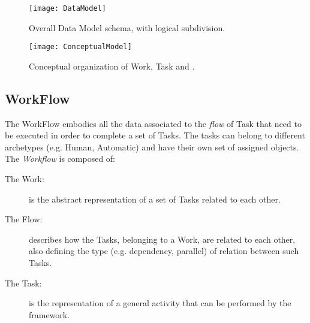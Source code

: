 \begin{figure}[htb]
    \centering
    \texttt{[image: DataModel]}
    \caption{Overall Data Model schema, with logical subdivision.}
    \label{fig:data-model}
\end{figure}
\begin{figure}[htb]
    \centering
    \texttt{[image: ConceptualModel]}
    \caption{Conceptual organization of Work, Task and \utask{}.}
    \label{fig:conceptual-model}
\end{figure}






\subsection{WorkFlow}
The WorkFlow embodies all the data associated to the \emph{flow} of Task
that need to be executed in order to complete a set of Tasks. The tasks can belong
to different archetypes (e.g. Human, Automatic) and have their own set of assigned
objects. The \emph{Workflow} is composed of:
\begin{description}
    \item[The Work:] is the abstract representation of a set of Tasks related
    to each other.
    \item[The Flow:] describes how the Tasks, belonging to a Work, are related
    to each other, also defining the type (e.g. dependency, parallel) of relation
    between such Tasks. 
    \item[The Task:] is the representation of a general activity that can be
    performed by the framework.
\end{description}

